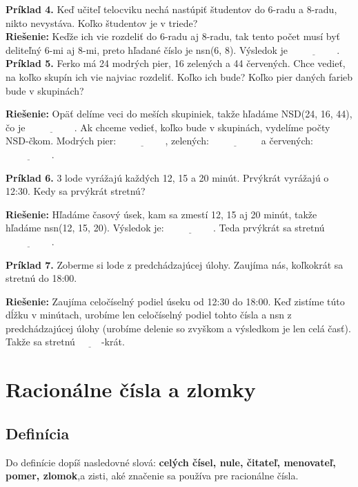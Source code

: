 \documentclass[12pt]{article}
\begin{document}
	\textbf{Príklad 4.} Keď učiteľ telocviku nechá nastúpiť študentov do 6-radu a 8-radu, nikto nevystáva. Koľko študentov je v triede?\\
	
	\textbf{Riešenie:} Keďže ich vie rozdeliť do 6-radu aj 8-radu, tak tento počet musí byť deliteľný 6-mi aj 8-mi, preto hľadané číslo je nsn(6, 8). Výsledok je $\underline{\hspace{2cm}}$.\\
	
	\textbf{Príklad 5.} Ferko má 24 modrých pier, 16 zelených a 44 červených. Chce vedieť, na koľko skupín ich vie najviac rozdeliť. Koľko ich bude? Koľko pier daných farieb bude v skupinách?
	
	\textbf{Riešenie:} Opäť delíme veci do meších skupiniek, takže hľadáme NSD(24, 16, 44), čo je $\underline{\hspace{2cm}}$. Ak chceme vedieť, koľko bude v skupinách, vydelíme počty NSD-čkom. Modrých pier: $\underline{\hspace{2cm}}$, zelených: $\underline{\hspace{2cm}}$ a červených: $\underline{\hspace{2cm}}$.
	
	\textbf{Príklad 6.} 3 lode vyrážajú každých 12, 15 a 20 minút. Prvýkrát vyrážajú o 12:30. Kedy sa prvýkrát stretnú?
	
	\textbf{Riešenie:} Hľadáme časový úsek, kam sa zmestí 12, 15 aj 20 minút, takže hľadáme nsn(12, 15, 20). Výsledok je: $\underline{\hspace{2cm}}$. Teda prvýkrát sa stretnú $\underline{\hspace{2cm}}$.
	
	\textbf{Príklad 7.} Zoberme si lode z predchádzajúcej úlohy. Zaujíma nás, koľkokrát sa stretnú do 18:00.
	
	\textbf{Riešenie:} Zaujíma celočíselný podiel úseku od 12:30 do 18:00. Keď zistíme túto dĺžku v minútach, urobíme len celočíselný podiel tohto čísla a nsn z predchádzajúcej úlohy (urobíme delenie so zvyškom a výsledkom je len celá časť). Takže sa stretnú $\underline{\hspace{1cm}}$-krát. 
	
	
	
	\newpage
	\section{Racionálne čísla a zlomky}
	
	\subsection{Definícia}
	\qquad Do definície dopíš nasledovné slová: \textbf{celých čísel, nule, čitateľ, menovateľ, pomer, zlomok},a zisti, aké značenie sa používa pre racionálne čísla. \newline
	
\end{document}
